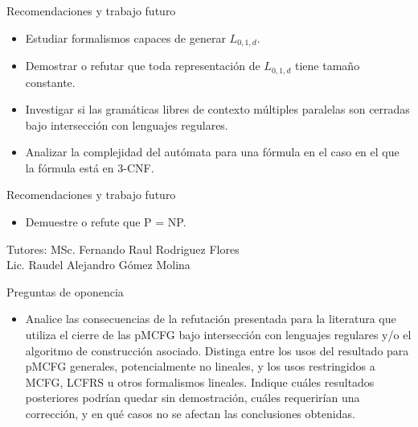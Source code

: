 \documentclass{beamer}
\newcommand{\repeatlang}{L_{0,1,d}}
\newcommand{\tutores}{MSc. Fernando Raul Rodriguez Flores \\ Lic. Raudel Alejandro Gómez Molina}
\begin{document}
\begin{frame}{Recomendaciones y trabajo futuro}

    \begin{itemize}

        \item Estudiar formalismos capaces de generar
              $\repeatlang$.
              \pause

        \item Demostrar o refutar que toda representación de $\repeatlang$ tiene tamaño constante.

              \pause

        \item Investigar si las gramáticas libres de contexto múltiples paralelas son cerradas bajo intersección con lenguajes regulares.

              \pause

        \item Analizar la complejidad del autómata para una fórmula en el caso en el que la fórmula está en 3-CNF.

    \end{itemize}

\end{frame}

\begin{frame}{Recomendaciones y trabajo futuro}
    \begin{itemize}
        \item \large Demuestre o refute que P = NP.
    \end{itemize}
\end{frame}

\begin{frame}
    \titlepage
    \vspace{1cm} %
    \begin{center}
        Tutores: \tutores \\ %
        \smallskip
    \end{center}
\end{frame}

\begin{frame}{Preguntas de oponencia}
    \begin{itemize}
        \item Analice las consecuencias de la refutación presentada para la literatura que utiliza el cierre de las pMCFG bajo intersección con lenguajes regulares y/o el algoritmo de construcción asociado. Distinga entre los usos del resultado para pMCFG generales, potencialmente no lineales, y los usos restringidos a MCFG, LCFRS u otros formalismos lineales. Indique cuáles resultados posteriores podrían quedar sin demostración, cuáles requerirían una corrección, y en qué casos no se afectan las conclusiones obtenidas.

    \end{itemize}
\end{frame}
\end{document}
